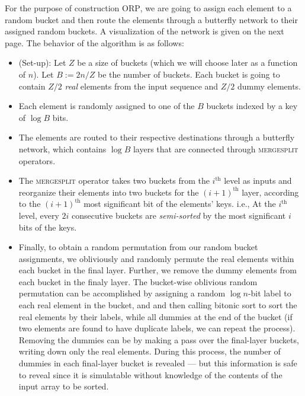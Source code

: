 For the purpose of construction \textsc{ORP}, we are going to assign each element to a random bucket and then route the elements through a butterfly network to their assigned random buckets. A visualization of the network is given on the next page. The behavior of the algorithm is as follows:
\begin{itemize}
    \item (Set-up): Let $Z$ be a size of buckets (which we will choose later as a function of $n$). Let $B := 2n/Z$ be the number of buckets. Each bucket is going to contain $Z/2$ \emph{real} elements from the input sequence and $Z/2$ dummy elements.

    \item Each element is randomly  assigned to one of the $B$ buckets indexed by a key of  $\log B$ bits.

    \item The elements are routed to their respective destinations through a butterfly network, which contains $\log B$ layers that are connected through \textsc{mergesplit} operators.

    \item The \textsc{mergesplit} operator takes two buckets from the $i^{\text{th}}$ level as inputs and reorganize their elements into two buckets for  the $(i+1)^{\text{th}}$ layer, according to the $(i+1)^{\text{th}}$ most significant bit of the elements' keys. i.e., At the $i^{\text{th}}$ level, every $2i$ consecutive buckets are \emph{semi-sorted} by the most significant $i$ bits of the keys.

    \item Finally, 
to obtain a random permutation from our random bucket assignments, 
we obliviously and randomly permute the real elements within 
each bucket in the final layer. Further, we remove
the dummy elements 
from each bucket in the finaly layer. 
The bucket-wise oblivious random permutation 
can be accomplished by assigning a random $\log n$-bit label
to each real element in the bucket, and 
and then calling bitonic sort to sort the real elements by their labels,
while all dummies at the end of the bucket (if two elements
are found to have duplicate labels, we can repeat the process).
Removing the dummies can be by making a pass over the final-layer buckets,
writing down only the real elements. 
During this process, the number of dummies in each final-layer bucket
is revealed --- but this information is safe to reveal
since it is simulatable without knowledge
of the contents  
of the input array to be sorted.
\end{itemize}

